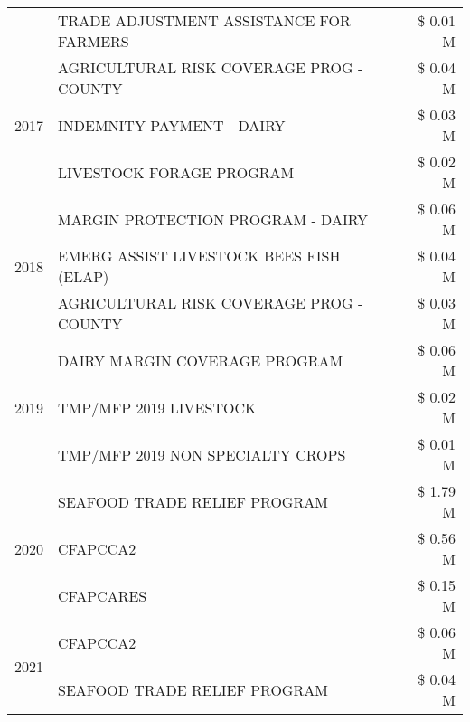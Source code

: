 \begin{tabular}{llr}
 & TRADE ADJUSTMENT ASSISTANCE FOR FARMERS & \$ 0.01 M \\
\cline{1-3}
\multirow[t]{3}{*}{2017} & AGRICULTURAL RISK COVERAGE PROG - COUNTY & \$ 0.04 M \\
 & INDEMNITY PAYMENT - DAIRY & \$ 0.03 M \\
 & LIVESTOCK FORAGE PROGRAM & \$ 0.02 M \\
\cline{1-3}
\multirow[t]{3}{*}{2018} & MARGIN PROTECTION PROGRAM - DAIRY & \$ 0.06 M \\
 & EMERG ASSIST LIVESTOCK BEES FISH (ELAP) & \$ 0.04 M \\
 & AGRICULTURAL RISK COVERAGE PROG - COUNTY & \$ 0.03 M \\
\cline{1-3}
\multirow[t]{3}{*}{2019} & DAIRY MARGIN COVERAGE PROGRAM & \$ 0.06 M \\
 & TMP/MFP 2019 LIVESTOCK & \$ 0.02 M \\
 & TMP/MFP 2019 NON SPECIALTY CROPS & \$ 0.01 M \\
\cline{1-3}
\multirow[t]{3}{*}{2020} & SEAFOOD TRADE RELIEF PROGRAM & \$ 1.79 M \\
 & CFAPCCA2 & \$ 0.56 M \\
 & CFAPCARES & \$ 0.15 M \\
\cline{1-3}
\multirow[t]{2}{*}{2021} & CFAPCCA2 & \$ 0.06 M \\
 & SEAFOOD TRADE RELIEF PROGRAM & \$ 0.04 M \\
\cline{1-3}
\bottomrule
\end{tabular}
